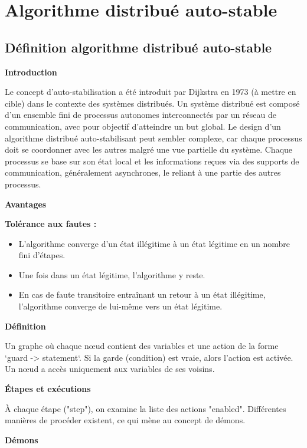 \documentclass[11pt]{article}
\begin{document}
\section{Algorithme distribué auto-stable}
\label{sec:org4a5ea9e}


\subsection{Définition algorithme distribué auto-stable}
\label{sec:orgad8ffcf}


\textbf{\textbf{Introduction}}

Le concept d'auto-stabilisation a été introduit par Dijkstra en 1973 (à mettre en cible) dans le contexte des systèmes distribués. 
Un système distribué est composé d'un ensemble fini de processus autonomes interconnectés par un réseau de communication, 
avec pour objectif d'atteindre un but global. Le design d'un algorithme distribué auto-stabilisant peut sembler complexe, 
car chaque processus doit se coordonner avec les autres malgré une vue partielle du système. 
Chaque processus se base sur son état local et les informations reçues via des supports de communication, généralement asynchrones, 
le reliant à une partie des autres processus.

\textbf{\textbf{Avantages}}

\textbf{\textbf{Tolérance aux fautes :}}
\begin{itemize}
\item L'algorithme converge d'un état illégitime à un état légitime en un nombre fini d'étapes.
\item Une fois dans un état légitime, l'algorithme y reste.
\item En cas de faute transitoire entraînant un retour à un état illégitime, l'algorithme converge de lui-même vers un état légitime.
\end{itemize}


\textbf{\textbf{Définition}}

Un graphe où chaque nœud contient des variables et une action de la forme `guard -> statement`. 
Si la garde (condition) est vraie, alors l'action est activée. Un nœud a accès uniquement aux variables de ses voisins.

\textbf{\textbf{Étapes et exécutions}}

À chaque étape ("step"), on examine la liste des actions "enabled". 
Différentes manières de procéder existent, ce qui mène au concept de démons.

\textbf{\textbf{Démons}}
\end{document}
